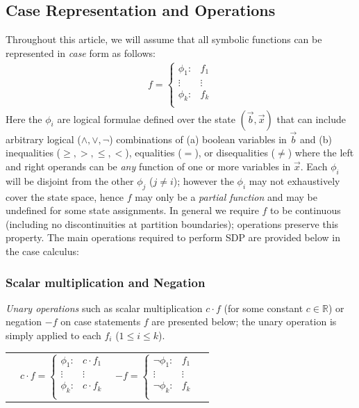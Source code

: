 \documentclass[twoside,11pt]{article}
\begin{document}
\subsection{Case Representation and Operations}
Throughout this article, we will assume that all symbolic functions
can be represented in \emph{case} form as follows:
{%
\begin{align*}
f = 
\begin{cases}
  \phi_1: & f_1 \\ 
 \vdots&\vdots\\ 
  \phi_k: & f_k \\ 
\end{cases}
\end{align*}
}
Here the $\phi_i$ are logical formulae defined over the state
$(\vec{b},\vec{x})$ that can include arbitrary logical ($\land,\lor,\neg$)
combinations of (a) boolean variables in $\vec{b}$ and (b) 
inequalities ($\geq,>,\leq,<$), equalities ($=$), or disequalities ($\neq$)
where the left and right operands can be \emph{any} function of one or more 
variables in $\vec{x}$.  
Each $\phi_i$ will be disjoint from the other $\phi_j$ ($j \neq i$); 
however the $\phi_i$ may not exhaustively cover the state space, hence
$f$ may only be a \emph{partial function} and may be undefined for some
state assignments. In general we require $f$ to be continuous (including no discontinuities at partition boundaries); operations preserve this property. The main operations required to perform SDP are provided below in the case calculus: 
\subsubsection*{Scalar multiplication and Negation}
\emph{Unary operations} such as scalar multiplication $c\cdot f$ (for
some constant $c \in \mathbb{R}$) or negation $-f$ on case statements
$f$ are presented below; the unary operation is simply applied to each
$f_i$ ($1 \leq i \leq k$). 
{%
\begin{center}
\begin{tabular}{r c c l}
&
  $c \cdot f = \begin{cases}
    \phi_1  : & c \cdot f_1 \\ 
   \vdots&\vdots\\ 
    \phi_k : & c \cdot f_k \\ 
  \end{cases}$
 &
\vspace{10mm}
  $-f = \begin{cases}
    \neg \phi_1 : & f_1 \\ 
   \vdots&\vdots\\ 
    \neg \phi_k : & f_k \\ 
  \end{cases}$
\end{tabular}
\end{center}
}
\vspace{-9mm} 
\end{document}
